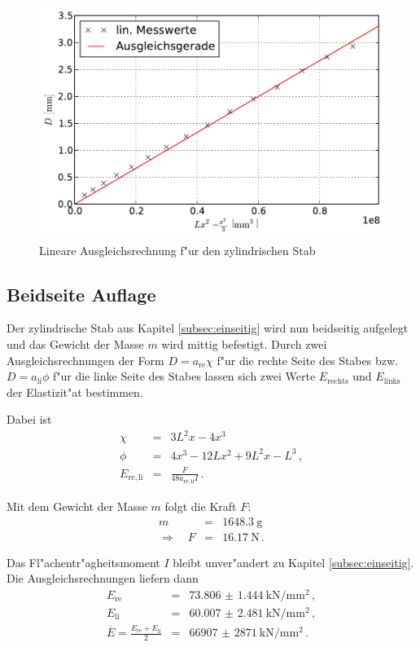 		\begin{figure}[h]
			\centering
			\includegraphics[width = 13cm]{img/plot2.pdf}
			\caption{Lineare Ausgleichsrechnung f"ur den zylindrischen Stab \label{fig:plot2}}
		\end{figure}

		\clearpage

	\subsection{Beidseite Auflage}
	\label{subsec:beidseitig}
		Der zylindrische Stab aus Kapitel \ref{subsec:einseitig} wird nun beidseitig aufgelegt und das Gewicht der Masse $m$ wird mittig befestigt.
		Durch zwei Ausgleichsrechnungen der Form $D = a_\mathrm{re}\chi$ f"ur die rechte Seite des Stabes bzw. $D = a_\mathrm{li}\phi$ f"ur die linke Seite des Stabes lassen sich zwei Werte $E_\mathrm{rechts}$ und $E_\mathrm{links}$ der Elastizit"at bestimmen.

		Dabei ist
		\begin{eqnarray*}
			\chi & = & 3L^2x - 4x^3 \, \\
			\phi & = & 4x^3 - 12 Lx^2 + 9L^2x - L^3 \,, \\
			E_\mathrm{re,li} & = & \frac{F}{48 a_\mathrm{re,li} I} \,.
		\end{eqnarray*}

		Mit dem Gewicht der Masse $m$ folgt die Kraft $F$:
		\begin{eqnarray*}
			m & = & \SI{1648.3}{\gram} \, \\
			\Rightarrow \quad F & = & \SI{16.17}{\newton} \,.
		\end{eqnarray*}

		Das Fl"achentr"agheitsmoment $I$ bleibt unver"andert zu Kapitel \ref{subsec:einseitig}.
		Die Ausgleichsrechnungen liefern dann
		\begin{eqnarray*}
			E_\mathrm{re} & = & \SI{73.806(1444)}{\kilo \newton \per \milli \meter \squared} \,, \\
			E_\mathrm{li} & = & \SI{60.007(2481)}{\kilo \newton \per \milli \meter \squared} \,, \\
			\overline{E} = \frac{E_\mathrm{re} + E_\mathrm{li}}{2} & = & \SI{66907(2871)}{\kilo \newton \per \milli \meter \squared} \,.
		\end{eqnarray*}

